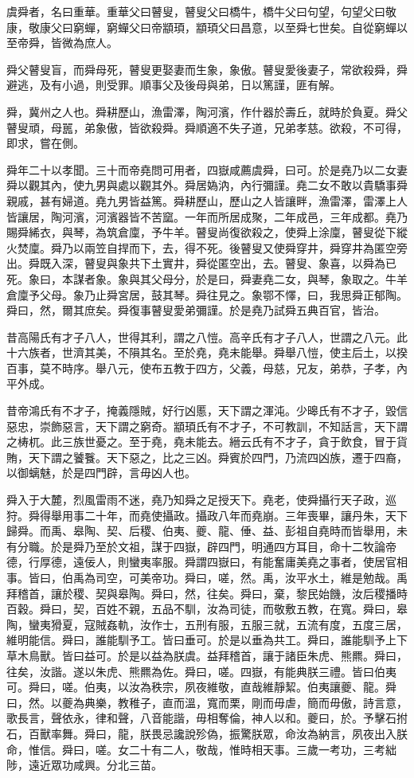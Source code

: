 虞舜者，名曰重華。重華父曰瞽叟，瞽叟父曰橋牛，橋牛父曰句望，句望父曰敬康，敬康父曰窮蟬，窮蟬父曰帝顓頊，顓頊父曰昌意，以至舜七世矣。自從窮蟬以至帝舜，皆微為庶人。

舜父瞽叟盲，而舜母死，瞽叟更娶妻而生象，象傲。瞽叟愛後妻子，常欲殺舜，舜避逃，及有小過，則受罪。順事父及後母與弟，日以篤謹，匪有解。

舜，冀州之人也。舜耕歷山，漁雷澤，陶河濱，作什器於壽丘，就時於負夏。舜父瞽叟頑，母嚚，弟象傲，皆欲殺舜。舜順適不失子道，兄弟孝慈。欲殺，不可得，即求，嘗在側。

舜年二十以孝聞。三十而帝堯問可用者，四嶽咸薦虞舜，曰可。於是堯乃以二女妻舜以觀其內，使九男與處以觀其外。舜居媯汭，內行彌謹。堯二女不敢以貴驕事舜親戚，甚有婦道。堯九男皆益篤。舜耕歷山，歷山之人皆讓畔，漁雷澤，雷澤上人皆讓居，陶河濱，河濱器皆不苦窳。一年而所居成聚，二年成邑，三年成都。堯乃賜舜絺衣，與琴，為筑倉廩，予牛羊。瞽叟尚復欲殺之，使舜上涂廩，瞽叟從下縱火焚廩。舜乃以兩笠自捍而下，去，得不死。後瞽叟又使舜穿井，舜穿井為匿空旁出。舜既入深，瞽叟與象共下土實井，舜從匿空出，去。瞽叟、象喜，以舜為已死。象曰，本謀者象。象與其父母分，於是曰，舜妻堯二女，與琴，象取之。牛羊倉廩予父母。象乃止舜宮居，鼓其琴。舜往見之。象鄂不懌，曰，我思舜正郁陶。舜曰，然，爾其庶矣。舜復事瞽叟愛弟彌謹。於是堯乃試舜五典百官，皆治。

昔高陽氏有才子八人，世得其利，謂之八愷。高辛氏有才子八人，世謂之八元。此十六族者，世濟其美，不隕其名。至於堯，堯未能舉。舜舉八愷，使主后土，以揆百事，莫不時序。舉八元，使布五教于四方，父義，母慈，兄友，弟恭，子孝，內平外成。

昔帝鴻氏有不才子，掩義隱賊，好行凶慝，天下謂之渾沌。少暤氏有不才子，毀信惡忠，崇飾惡言，天下謂之窮奇。顓頊氏有不才子，不可教訓，不知話言，天下謂之梼杌。此三族世憂之。至于堯，堯未能去。縉云氏有不才子，貪于飲食，冒于貨賄，天下謂之饕餮。天下惡之，比之三凶。舜賓於四門，乃流四凶族，遷于四裔，以御螭魅，於是四門辟，言毋凶人也。

舜入于大麓，烈風雷雨不迷，堯乃知舜之足授天下。堯老，使舜攝行天子政，巡狩。舜得舉用事二十年，而堯使攝政。攝政八年而堯崩。三年喪畢，讓丹朱，天下歸舜。而禹、皋陶、契、后稷、伯夷、夔、龍、倕、益、彭祖自堯時而皆舉用，未有分職。於是舜乃至於文祖，謀于四嶽，辟四門，明通四方耳目，命十二牧論帝德，行厚德，遠佞人，則蠻夷率服。舜謂四嶽曰，有能奮庸美堯之事者，使居官相事。皆曰，伯禹為司空，可美帝功。舜曰，嗟，然。禹，汝平水土，維是勉哉。禹拜稽首，讓於稷、契與皋陶。舜曰，然，往矣。舜曰，棄，黎民始饑，汝后稷播時百穀。舜曰，契，百姓不親，五品不馴，汝為司徒，而敬敷五教，在寬。舜曰，皋陶，蠻夷猾夏，寇賊姦軌，汝作士，五刑有服，五服三就，五流有度，五度三居，維明能信。舜曰，誰能馴予工。皆曰垂可。於是以垂為共工。舜曰，誰能馴予上下草木鳥獸。皆曰益可。於是以益為朕虞。益拜稽首，讓于諸臣朱虎、熊羆。舜曰，往矣，汝諧。遂以朱虎、熊羆為佐。舜曰，嗟。四嶽，有能典朕三禮。皆曰伯夷可。舜曰，嗟。伯夷，以汝為秩宗，夙夜維敬，直哉維靜絜。伯夷讓夔、龍。舜曰，然。以夔為典樂，教稚子，直而溫，寬而栗，剛而毋虐，簡而毋傲，詩言意，歌長言，聲依永，律和聲，八音能諧，毋相奪倫，神人以和。夔曰，於。予擊石拊石，百獸率舞。舜曰，龍，朕畏忌讒說殄偽，振驚朕眾，命汝為納言，夙夜出入朕命，惟信。舜曰，嗟。女二十有二人，敬哉，惟時相天事。三歲一考功，三考絀陟，遠近眾功咸興。分北三苗。

